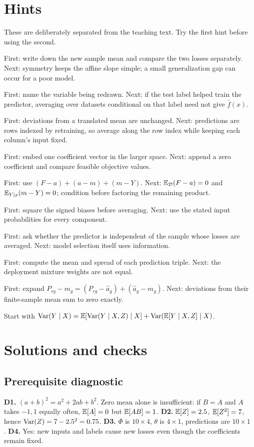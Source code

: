 \section*{Hints}
These are deliberately separated from the teaching text. Try the first hint before using the second.
\begin{description}[style=nextline]
\item[A1--A2] First: write down the new sample mean and compare the two losses separately. Next: symmetry keeps the affine slope simple; a small generalization gap can occur for a poor model.
\item[A3--A4] First: name the variable being redrawn. Next: if the test label helped train the predictor, averaging over datasets conditional on that label need not give $\bar f(x)$.
\item[A5--A6] First: deviations from a translated mean are unchanged. Next: predictions are rows indexed by retraining, so average along the row index while keeping each column's input fixed.
\item[E1] First: embed one coefficient vector in the larger space. Next: append a zero coefficient and compare feasible objective values.
\item[E2] First: use $(F-a)+(a-m)+(m-Y)$. Next: $\mathbb{E}_{\mathcal D}(F-a)=0$ and $\mathbb{E}_{Y\mid x}(m-Y)=0$; condition before factoring the remaining product.
\item[E3] First: square the signed biases before averaging. Next: use the stated input probabilities for every component.
\item[E4] First: ask whether the predictor is independent of the sample whose losses are averaged. Next: model selection itself uses information.
\item[E5] First: compute the mean and spread of each prediction triple. Next: the deployment mixture weights are not equal.
\item[E6] First: expand $P_{rg}-m_g=(P_{rg}-\hat a_g)+(\hat a_g-m_g)$. Next: deviations from their finite-sample mean sum to zero exactly.
\item[Optional challenge] Start with $\operatorname{Var}(Y\mid X)=\mathbb{E}[\operatorname{Var}(Y\mid X,Z)\mid X]+\operatorname{Var}(\mathbb{E}[Y\mid X,Z]\mid X)$.
\end{description}

\section*{Solutions and checks}
\subsection*{Prerequisite diagnostic}
\textbf{D1.} $(a+b)^2=a^2+2ab+b^2$. Zero mean alone is insufficient: if $B=A$ and $A$ takes $-1,1$ equally often, $\mathbb{E}[A]=0$ but $\mathbb{E}[AB]=1$. \textbf{D2.} $\mathbb{E}[Z]=2.5$, $\mathbb{E}[Z^2]=7$, hence $\operatorname{Var}(Z)=7-2.5^2=0.75$. \textbf{D3.} $\Phi$ is $10\times4$, $\theta$ is $4\times1$, predictions are $10\times1$. \textbf{D4.} Yes: new inputs and labels cause new losses even though the coefficients remain fixed.

